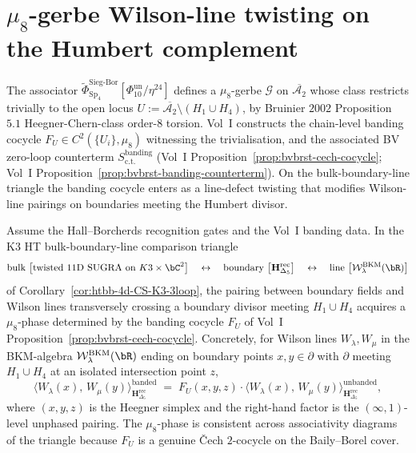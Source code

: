 \section{$\mu_8$-gerbe Wilson-line twisting on the Humbert complement}
\label{sec:htbb-mu8-wilson-twisting}

The associator
$\widetilde{\Phi}^{\mathrm{Sieg\text{-}Bor}}_{\mathrm{Sp}_4}
[\Phi_{10}^{\mathrm{un}}/\eta^{24}]$ defines a $\mu_8$-gerbe $\mathcal{G}$ on
$\overline{\mathcal{A}_2}$ whose class restricts trivially to the open
locus $U := \overline{\mathcal{A}_2}\setminus(H_1\cup H_4)$, by
Bruinier $2002$ Proposition~$5.1$ Heegner-Chern-class order-$8$
torsion. Vol~I constructs the chain-level banding cocycle
$F_U \in C^2(\{U_i\},\mu_8)$ witnessing the trivialisation, and the
associated BV zero-loop counterterm
$S^{\mathrm{banding}}_{\mathrm{c.t.}}$ \textup{(}Vol~I
Proposition~\ref{prop:bvbrst-cech-cocycle}; Vol~I
Proposition~\ref{prop:bvbrst-banding-counterterm}\textup{).}
On the bulk-boundary-line triangle the banding cocycle enters as a
line-defect twisting that modifies Wilson-line pairings on boundaries
meeting the Humbert divisor.

\begin{theorem}
\label{thm:htbb-W18-banding-wilson-line}
Assume the Hall--Borcherds recognition gates and the Vol~I banding data.
In the K3 HT bulk-boundary-line comparison triangle
\[
 \text{bulk } \bigl[\text{twisted 11D SUGRA on } K3\times\bC^2\bigr]
 \quad\leftrightarrow\quad
 \text{boundary } \bigl[\mathbf{H}_{\Delta_5}^{\mathrm{rec}}\bigr]
 \quad\leftrightarrow\quad
 \text{line } \bigl[\mathcal{W}^{\mathrm{BKM}}_\lambda(\bR)\bigr]
\]
of Corollary~\textup{\ref{cor:htbb-4d-CS-K3-3loop},} the pairing
between boundary fields and Wilson lines transversely crossing a
boundary divisor meeting $H_1 \cup H_4$ acquires a $\mu_8$-phase
determined by the banding cocycle $F_U$ of Vol~I
Proposition~\textup{\ref{prop:bvbrst-cech-cocycle}.}
Concretely, for Wilson lines $W_\lambda, W_\mu$ in the BKM-algebra
$\mathcal{W}^{\mathrm{BKM}}_\lambda(\bR)$ ending on boundary points
$x, y \in \partial$ with $\partial$ meeting $H_1 \cup H_4$ at an
isolated intersection point $z$,
\[
 \bigl\langle W_\lambda(x),\, W_\mu(y) \bigr\rangle^{\mathrm{banded}}_{\mathbf{H}_{\Delta_5}^{\mathrm{rec}}}
 \;=\; F_U(x, y, z)\cdot
 \bigl\langle W_\lambda(x),\, W_\mu(y) \bigr\rangle^{\mathrm{unbanded}}_{\mathbf{H}_{\Delta_5}^{\mathrm{rec}}},
\]
where $(x, y, z)$ is the Heegner simplex and the right-hand factor is
the $(\infty,1)$-level unphased pairing. The $\mu_8$-phase is
consistent across associativity diagrams of the triangle because
$F_U$ is a genuine \v Cech $2$-cocycle on the Baily--Borel cover.
\end{theorem}

